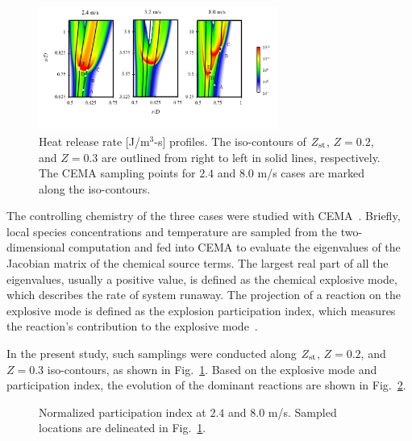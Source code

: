 \documentclass[review,3p,times]{elsarticle}
\begin{document}
\begin{figure}[t]
  \centering
  \scriptsize
  \vspace{-0.1in}
  \includegraphics[width=0.7\textwidth]{HRR_V.png}
  \normalsize
  \vspace{-0.4in}
  \caption{Heat release rate [J/m$^3$-s] profiles.  The iso-contours of $Z_{\rm st}$, $Z = 0.2$, and $Z = 0.3$ are outlined from right to left in solid lines, respectively.  The CEMA sampling points for $2.4$ and $8.0$ m/s cases are marked along the iso-contours.}
  \label{fig:HRR_V}
\end{figure}

The controlling chemistry of the three cases were studied with CEMA~\cite{lu10,shan12}.   Briefly, local species concentrations and temperature are sampled from the two-dimensional computation and fed into CEMA to evaluate the eigenvalues of the Jacobian matrix of the chemical source terms.  The largest real part of all the eigenvalues, usually a positive value, is defined as the chemical explosive mode, which describes the rate of system runaway.  The projection of a reaction on the explosive mode is defined as the explosion participation index, which measures the reaction's contribution to the explosive mode~\cite{shan12}.

In the present study, such samplings were conducted along $Z_{\rm st}$, $Z = 0.2$, and $Z = 0.3$ iso-contours, as shown in Fig.~\ref{fig:HRR_V}.  Based on the explosive mode and participation index, the evolution of the dominant reactions are shown in Fig.~\ref{fig:CEMA_V}.

\begin{figure}
  \centering
  \scriptsize
  \resizebox{1.0\textwidth}{!}{}
  \resizebox{1.0\textwidth}{!}{}
  \normalsize
  \caption{Normalized participation index at $2.4$ and $8.0$ m/s.  Sampled locations are delineated in Fig.~\ref{fig:HRR_V}.}
  \label{fig:CEMA_V}
\end{figure}
\end{document}
